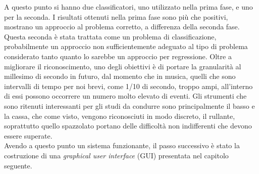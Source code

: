 A questo punto si hanno due classificatori, uno utilizzato nella prima fase, e uno per la seconda. I risultati ottenuti nella prima fase sono più che positivi, mostrano un approccio  al problema corretto, a differenza della seconda fase. Questa seconda è stata trattata come un problema di classificazione, probabilmente un approccio non sufficientemente adeguato al tipo di problema considerato tanto quanto lo sarebbe un approccio per regressione.
Oltre a migliorare il riconoscimento, uno degli obiettivi è di portare la granularità al millesimo di secondo in futuro, dal momento che in musica, quelli che sono intervalli di tempo per noi brevi, come 1/10 di secondo, troppo ampi, all'interno di essi possono occorrere un numero molto elevato di eventi. Gli strumenti che sono ritenuti interessanti per gli studi da condurre sono principalmente il basso e la cassa, che come visto, vengono riconosciuti in modo discreto, il rullante, soprattutto quello spazzolato portano delle difficoltà non indifferenti che devono essere superate.\\
Avendo a questo punto un sistema funzionante, il passo successivo è stato la costruzione di una \emph{graphical user interface} (GUI) presentata nel capitolo seguente.

